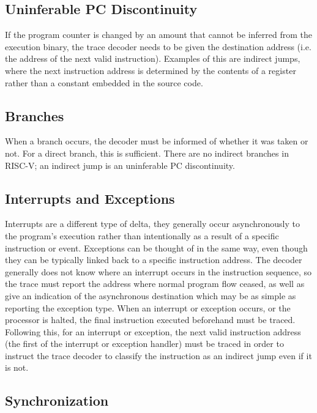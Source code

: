 \subsection{Uninferable PC Discontinuity} \label{uninfpc}

If the program counter is changed by an amount that cannot be
inferred from the execution binary, the trace decoder needs to be
given the destination address (i.e. the address of the next valid
instruction).  Examples of this are indirect jumps, where
the next instruction address is determined by the contents of a
register rather than a constant embedded in the source code.

\subsection{Branches} \label{branches}

When a branch occurs, the decoder must be informed of whether it was
taken or not.  For a direct branch, this is sufficient.  There are no
indirect branches in RISC-V; an indirect jump is an uninferable PC
discontinuity.

\subsection{Interrupts and Exceptions} \label{interruptsexceptions}

Interrupts are a different type of delta, they generally occur
asynchronously to the program's execution rather than intentionally as
a result of a specific instruction or event. Exceptions can be thought
of in the same way, even though they can be typically linked back to a
specific instruction address.  The decoder generally does not know
where an interrupt occurs in the instruction sequence, so the trace
must report the address where normal program flow ceased, as well as
give an indication of the asynchronous destination which may be as
simple as reporting the exception type.  When an interrupt or
exception occurs, or the processor is halted, the final instruction
executed beforehand must be traced.  Following this, for an interrupt
or exception, the next valid instruction address (the first of the
interrupt or exception handler) must be traced in order to instruct the
trace decoder to classify the instruction as an indirect jump even
if it is not.

\subsection{Synchronization} \label{synchronization}

